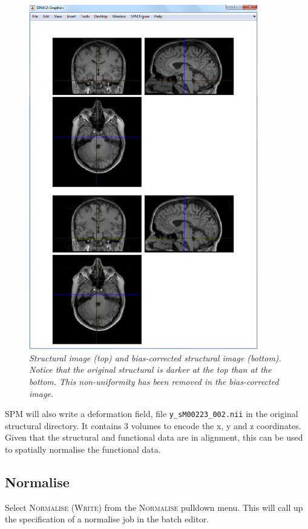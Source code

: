 \begin{figure}
\begin{center}
\includegraphics[width=100mm]{auditory/bias}
\caption{\em Structural image (top) and bias-corrected structural image (bottom). Notice that the original structural is darker at the top than at the bottom. This non-uniformity has been removed in the bias-corrected image.\label{aud_bias}}
\end{center}
\end{figure}

SPM will also write a deformation field, file \texttt{y\_sM00223\_002.nii} in the original structural directory. It contains 3 volumes to encode the x, y and z coordinates. Given that the structural and functional data are in alignment, this can be used to spatially normalise the functional data. 

\subsection{Normalise}

Select \textsc{Normalise (Write)} from the \textsc{Normalise} pulldown menu. This will call up the specification of a normalise job in the batch editor. 

